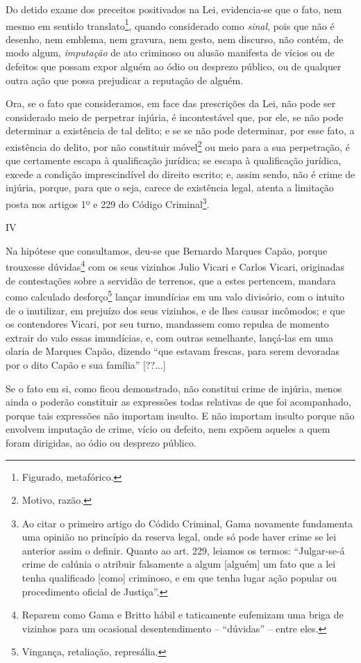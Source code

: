 Do detido exame dos preceitos positivados na Lei, evidencia-se que o
fato, nem mesmo em sentido translato\footnote{Figurado, metafórico.},
quando considerado como \emph{sinal}, pois que não é desenho, nem
emblema, nem gravura, nem gesto, nem discurso, não contém, de modo
algum, \emph{imputação} de ato criminoso ou alusão manifesta de vícios
ou de defeitos que possam expor alguém ao ódio ou desprezo público, ou
de qualquer outra ação que possa prejudicar a reputação de alguém.

Ora, se o fato que consideramos, em face das prescrições da Lei, não
pode ser considerado meio de perpetrar injúria, é incontestável que, por
ele, se não pode determinar a existência de tal delito; e se se não pode
determinar, por esse fato, a existência do delito, por não constituir
móvel\footnote{Motivo, razão.} ou meio para a sua perpetração, é que
certamente escapa à qualificação jurídica; se escapa à qualificação
jurídica, excede a condição imprescindível do direito escrito; e, assim
sendo, não é crime de injúria, porque, para que o seja, carece de
existência legal, atenta a limitação posta nos artigos 1º e 229 do
Código Criminal\footnote{Ao citar o primeiro artigo do Códido Criminal,
  Gama novamente fundamenta uma opinião no princípio da reserva legal,
  onde só pode haver crime se lei anterior assim o definir. Quanto ao
  art. 229, leiamos os termos: ``Julgar-se-á crime de calúnia o atribuir
  falsamente a algum {[}alguém{]} um fato que a lei tenha qualificado
  {[}como{]} criminoso, e em que tenha lugar ação popular ou
  procedimento oficial de Justiça''.}.

IV

Na hipótese que consultamos, deu-se que Bernardo Marques Capão, porque
trouxesse dúvidas\footnote{Reparem como Gama e Britto hábil e
  taticamente eufemizam uma briga de vizinhos para um ocasional
  desentendimento -- ``dúvidas'' -- entre eles.} com os seus vizinhos
Julio Vicari e Carlos Vicari, originadas de contestações sobre a
servidão de terrenos, que a estes pertencem, mandara como calculado
desforço\footnote{Vingança, retaliação, represália.} lançar imundícias
em um valo divisório, com o intuito de o inutilizar, em prejuízo dos
seus vizinhos, e de lhes causar incômodos; e que os contendores Vicari,
por seu turno, mandassem como repulsa de momento extrair do valo essas
imundícias, e, com outras semelhante, lançá-las em uma olaria de Marques
Capão, dizendo ``que estavam frescas, para serem devoradas por o dito
Capão e sua família'' {[}??...{]}

Se o fato em si, como ficou demonstrado, não constitui crime de injúria,
menos ainda o poderão constituir as expressões todas relativas de que
foi acompanhado, porque tais expressões não importam insulto. E não
importam insulto porque não envolvem imputação de crime, vício ou
defeito, nem expõem aqueles a quem foram dirigidas, ao ódio ou desprezo
público.

